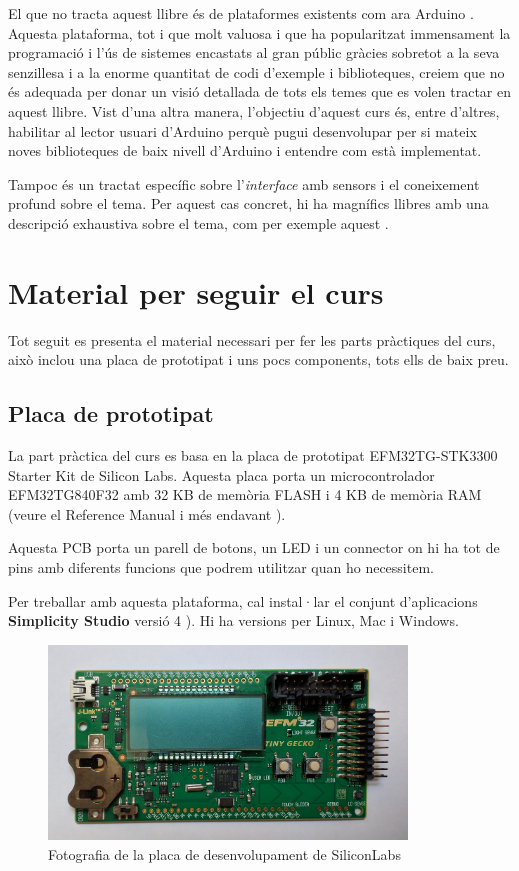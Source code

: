 El que no tracta aquest llibre és de plataformes existents com ara Arduino \cite{ARDUINO}. Aquesta plataforma, tot i que molt valuosa i que ha popularitzat immensament la programació i l'ús de sistemes encastats al gran públic gràcies sobretot a la seva senzillesa i a la enorme quantitat de codi d'exemple i biblioteques, creiem que no és adequada per donar un visió detallada de tots els temes que es volen tractar en aquest llibre. Vist d'una altra manera, l'objectiu d'aquest curs és, entre d'altres, habilitar al lector usuari d'Arduino perquè pugui desenvolupar per si mateix noves biblioteques de baix nivell d'Arduino i entendre com està implementat.

Tampoc és un tractat específic sobre l'{\em interface} amb sensors i el coneixement profund sobre el tema. Per aquest cas concret, hi ha magnífics llibres amb una descripció exhaustiva sobre el tema, com per exemple aquest \cite{SensorTechnology}.

\section{Material per seguir el curs}
Tot seguit es presenta el material necessari per fer les parts pràctiques del curs, això inclou una placa de prototipat i uns pocs components, tots ells de baix preu.

\subsection{Placa de prototipat}
La part pràctica del curs es basa en la placa de prototipat EFM32TG-STK3300 Starter Kit de Silicon Labs. Aquesta placa porta un microcontrolador EFM32TG840F32 amb 32 KB de memòria \gls{FLASH} i 4 KB de memòria \gls{RAM} (veure el Reference Manual \cite{EFM32TGRM} i més endavant ).

Aquesta \gls{PCB} porta un parell de botons, un \gls{LED} i un connector on hi ha tot de pins amb diferents funcions que podrem utilitzar quan ho necessitem.

Per treballar amb aquesta plataforma, cal instal·lar el conjunt d'aplicacions {\bf Simplicity Studio} versió 4 \cite{simplicityURL}). Hi ha versions per Linux, Mac i Windows.

\begin{figure}
 \centering
 \includegraphics[width=0.85\textwidth, keepaspectratio]{imatges/tiny-gecko-starter-kit.jpg}
 \caption{Fotografia de la placa de desenvolupament de SiliconLabs}
 \label{fig:EFM32_DVK}
\end{figure}


